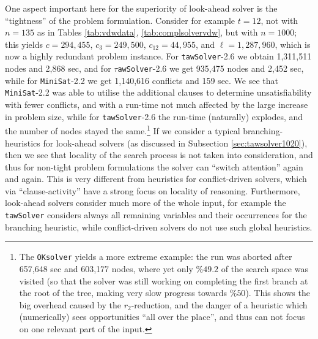 \documentclass[final,3p,times]{elsarticle}
\theoremstyle{definition}
\newcommand{\tawsolver}{\texttt{tawSolver}}
\newcommand{\ntawsolver}{\tawsolver-2.6}
\newcommand{\ttawsolver}{$\tau$\texttt{awSolver}-2.6}
\newcommand{\oksolver}{\texttt{OKsolver}}
\newcommand{\minisat}{\texttt{MiniSat}}
\begin{document}
One aspect important here for the superiority of look-ahead solver is the ``tightness'' of the problem formulation. Consider for example $t=12$, not with $n=135$ as in Tables \ref{tab:vdwdata}, \ref{tab:complsolvervdw}, but with $n=1000$; this yields $c = 294{,}455$, $c_3 = 249{,}500$, $c_{12} = 44{,}955$, and $\ell = 1{,}287{,}960$, which is now a highly redundant problem instance. For \ntawsolver{} we obtain 1,311,511 nodes and 2,868 sec, and for \ttawsolver{} we get 935,475 nodes and 2,452 sec, while for \minisat-2.2 we get 1,140,616 conflicts and 159 sec. We see that \minisat-2.2 was able to utilise the additional clauses to determine unsatisfiability with fewer conflicts, and with a run-time not much affected by the large increase in problem size, while for \ntawsolver{} the run-time (naturally) explodes, and the number of nodes stayed the same.\footnote{The \oksolver{} yields a more extreme example: the run was aborted after 657,648 sec and 603,177 nodes, where yet only $\%49.2$ of the search space was visited (so that the solver was still working on completing the first branch at the root of the tree, making very slow progress towards $\%50$). This shows the big overhead caused by the $r_2$-reduction, and the danger of a heuristic which (numerically) sees opportunities ``all over the place'', and thus can not focus on one relevant part of the input.} If we consider a typical branching-heuristics for look-ahead solvers (as discussed in Subsection \ref{sec:tawsolver1020}), then we see that locality of the search process is not taken into consideration, and thus for non-tight problem formulations the solver can ``switch attention'' again and again. This is very different from heuristics for conflict-driven solvers, which via ``clause-activity'' have a strong focus on locality of reasoning. Furthermore, look-ahead solvers consider much more of the whole input, for example the \tawsolver{} considers always all remaining variables and their occurrences for the branching heuristic, while conflict-driven solvers do not use such global heuristics.
\end{document}
